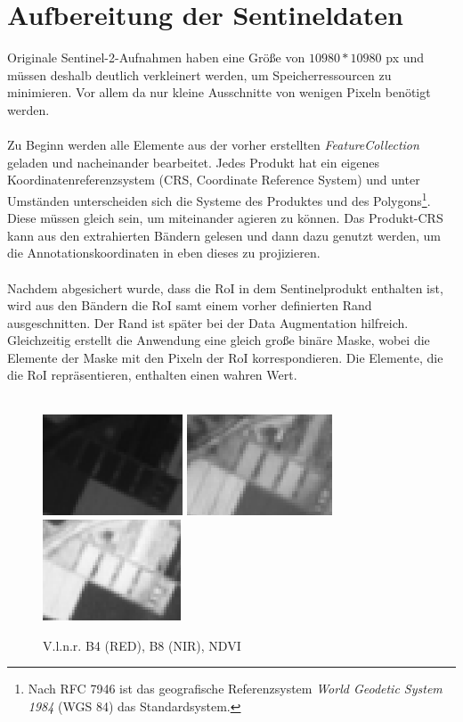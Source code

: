 \section{Aufbereitung der Sentineldaten}

Originale Sentinel-2-Aufnahmen haben eine Größe von $10980*10980$ px und müssen deshalb deutlich verkleinert werden, um Speicherressourcen zu minimieren. Vor allem da nur kleine Ausschnitte von wenigen Pixeln benötigt werden. 
\\\\
Zu Beginn werden alle Elemente aus der vorher erstellten \textit{FeatureCollection} geladen und nacheinander bearbeitet. Jedes Produkt hat ein eigenes Koordinatenreferenzsystem (CRS, Coordinate Reference System) und unter Umständen unterscheiden sich die Systeme des Produktes und des Polygons\footnote{Nach RFC 7946 ist das geografische Referenzsystem \textit{World Geodetic
 System 1984} (WGS 84) das Standardsystem.\cite{ref:rfc7946}}. Diese müssen gleich sein, um miteinander agieren zu können. Das Produkt-CRS kann aus den extrahierten Bändern gelesen und dann dazu genutzt werden, um die Annotationskoordinaten in eben dieses zu projizieren.
 \\\\
 Nachdem abgesichert wurde, dass die RoI in dem Sentinelprodukt enthalten ist, wird aus den Bändern die RoI samt einem vorher definierten Rand ausgeschnitten. Der Rand ist später bei der Data Augmentation hilfreich. Gleichzeitig erstellt die Anwendung eine gleich große binäre Maske, wobei die Elemente der Maske mit den Pixeln der RoI korrespondieren. Die Elemente, die die RoI repräsentieren, enthalten einen wahren Wert.
 \\\\
\begin{figure}[ht]
  \centering
  \includegraphics[height=3cm]{pics/b4.PNG}
  \includegraphics[height=3cm]{pics/b8.PNG}
  \includegraphics[height=3cm]{pics/ndvi.PNG}
  \caption[B4 - B8 - NDVI]{V.l.n.r. B4 (RED), B8 (NIR), NDVI}
  \label{fig:ndvi}
\end{figure}
